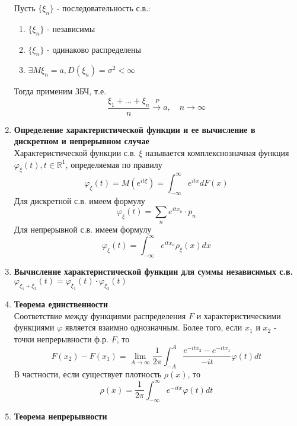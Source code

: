 \documentclass[A4]{article}
\begin{document}
\begin{enumerate}
	Пусть $\{\xi_n\}$ - последовательность с.в.:
	\begin{enumerate}
		\item $\{\xi_n\}$ - независимы
		\item $\{\xi_n\}$ - одинаково распределены
		\item $\exists M\xi_n=a,D(\xi_n)=\sigma^2<\infty$
	\end{enumerate}
	Тогда применим ЗБЧ, т.е.
	\begin{equation}
	\frac{\xi_1+\ldots+\xi_n}{n}\stackrel{P}{\rightarrow}a,\quad n\rightarrow\infty
	\end{equation}
	\item \textbf{Определение характеристической функции и ее вычисление в дискретном и непрерывном случае}\\
	Характеристической функции с.в. $\xi$ называется комплекснозначная функция $\varphi_{\xi}(t),t\in \mathbb{R}^1$, определяемая по правилу
	\begin{equation}
	\varphi_{\xi}(t)=M(e^{it\xi})=\int_{-\infty}^{\infty} e^{itx}dF(x)
	\end{equation}
	Для дискретной с.в. имеем формулу
	\begin{equation}
	\varphi_{\xi}(t)=\sum_{n} e^{itx_n}\cdot p_n
	\end{equation}
	Для непрерывной с.в. имеем формулу
	\begin{equation}
	\varphi_{\xi}(t)=\int_{-\infty}^{\infty} e^{itx_n}\rho_{\xi}(x)dx
	\end{equation}
	\item \textbf{Вычисление характеристической функции для суммы независимых с.в.}\\
	$\varphi_{\xi_1+\xi_2}(t)=\varphi_{\xi_1}(t)\cdot \varphi_{\xi_2}(t)$
	\item \textbf{Теорема единственности}\\
	Соответствие между функциями распределения $F$ и характеристическими функциями $\varphi$ является взаимно однозначным. Более того, если $x_1$ и $x_2$ - точки непрерывности ф.р. $F$, то
	\begin{equation}
	F(x_2)-F(x_1)=\lim_{A\rightarrow\infty}\frac{1}{2\pi}\int_{-A}^{A} \frac{e^{-itx_2}-e^{-itx_1}}{-it}\varphi(t)dt
	\end{equation}
	В частности, если существует плотность $\rho(x)$, то
	\begin{equation}
	\rho(x)=\frac{1}{2\pi}\int_{-\infty}^{\infty} e^{-itx}\varphi(t)dt
	\end{equation}
	\item \textbf{Теорема непрерывности}\\

\end{enumerate}
\end{document}
